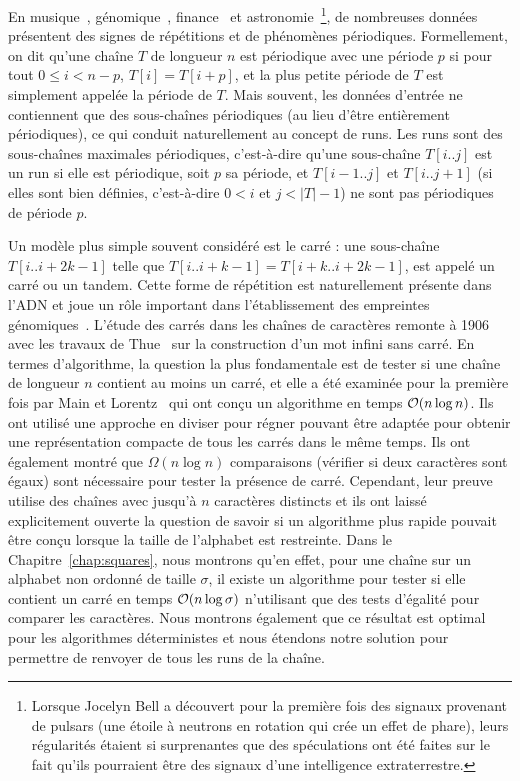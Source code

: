 En musique~\cite{arom1989time}, génomique~\cite{pich2018somatic}, finance~\cite{harvey2007trends} et astronomie~\cite{hewish1979observation}\footnote{ Lorsque Jocelyn Bell a découvert pour la première fois des signaux provenant de pulsars (une étoile à neutrons en rotation qui crée un effet de phare), leurs régularités étaient si surprenantes que des spéculations ont été faites sur le fait qu'ils pourraient être des signaux d'une intelligence extraterrestre.}, de nombreuses données présentent des signes de répétitions et de phénomènes périodiques.
Formellement, on dit qu'une chaîne $T$ de longueur $n$ est périodique avec une période $p$ si pour tout $0 \leq i < n - p$, $T[i]=T[i+p]$, et la plus petite période de $T$ est simplement appelée la période de $T$.
%
Mais souvent, les données d'entrée ne contiennent que des sous-chaînes périodiques (au lieu d'être entièrement périodiques), ce qui conduit naturellement au concept de \og{}runs\fg{}. Les runs sont des sous-chaînes maximales périodiques, c'est-à-dire qu'une sous-chaîne $T[i..j]$ est un run si elle est périodique, soit $p$ sa période, et $T[i-1..j]$ et $T[i..j+1]$ (si elles sont bien définies, c'est-à-dire $0<i$ et $j<|T|-1$) ne sont pas périodiques de période $p$. 

Un modèle plus simple souvent considéré est le carré : une sous-chaîne $T[i..i+2k-1]$ telle que $T[i..i+k-1]=T[i+k..i+2k-1]$, est appelé un carré ou un tandem. Cette forme de répétition est naturellement présente dans l'ADN et joue un rôle important dans l'établissement des empreintes génomiques~\cite{Kolpakov2003,GYMREK20179}. 
%
L'étude des carrés dans les chaînes de caractères remonte à 1906 avec les travaux de Thue~\cite{thue1906} sur la construction d'un mot infini sans carré. En termes d'algorithme, la question la plus fondamentale est de tester si une chaîne de longueur $n$ contient au moins un carré, et elle a été examinée pour la première fois par Main et Lorentz~\cite{Main1984} qui ont conçu un algorithme en temps $\mathcal{O}(n \log n)$. Ils ont utilisé une approche en \og{}diviser pour régner\fg{} pouvant être adaptée pour obtenir une représentation compacte de tous les carrés dans le même temps. Ils ont également montré que $\Omega(n\log n)$ comparaisons (vérifier si deux caractères sont égaux) sont nécessaire pour tester la présence de carré. Cependant, leur preuve utilise des chaînes avec jusqu'à $n$ caractères distincts et ils ont laissé explicitement ouverte la question de savoir si un algorithme plus rapide pouvait être conçu lorsque la taille de l'alphabet est restreinte. 
Dans le Chapitre~\ref{chap:squares}, nous montrons qu'en effet, pour une chaîne sur un alphabet non ordonné de taille $\sigma$, il existe un algorithme pour tester si elle contient un carré en temps $\mathcal{O}(n\log \sigma)$ n'utilisant que des tests d'égalité pour comparer les caractères. Nous montrons également que ce résultat est optimal pour les algorithmes déterministes et nous étendons notre solution pour permettre de renvoyer de tous les runs de la chaîne.

